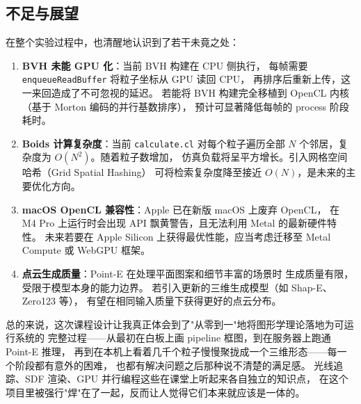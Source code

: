 \subsection{不足与展望}

在整个实验过程中，也清醒地认识到了若干未竟之处：

\begin{enumerate}
  \item \textbf{BVH 未能 GPU 化}：当前 BVH 构建在 CPU 侧执行，
        每帧需要 \texttt{enqueueReadBuffer} 将粒子坐标从 GPU 读回 CPU，
        再排序后重新上传，这一来回造成了不可忽视的延迟。
        若能将 BVH 构建完全移植到 OpenCL 内核（基于 Morton 编码的并行基数排序），
        预计可显著降低每帧的 process 阶段耗时。
  \item \textbf{Boids 计算复杂度}：当前 \texttt{calculate.cl} 对每个粒子遍历全部
        $N$ 个邻居，复杂度为 $O(N^2)$。随着粒子数增加，
        仿真负载将呈平方增长。引入网格空间哈希（Grid Spatial Hashing）
        可将检索复杂度降至接近 $O(N)$，是未来的主要优化方向。
  \item \textbf{macOS OpenCL 兼容性}：Apple 已在新版 macOS 上废弃 OpenCL，
        在 M4 Pro 上运行时会出现 API 飘黄警告，且无法利用 Metal 的最新硬件特性。
        未来若要在 Apple Silicon 上获得最优性能，应当考虑迁移至 Metal Compute 或
        WebGPU 框架。
  \item \textbf{点云生成质量}：Point-E 在处理平面图案和细节丰富的场景时
        生成质量有限，受限于模型本身的能力边界。
        若引入更新的三维生成模型（如 Shap-E、Zero123 等），
        有望在相同输入质量下获得更好的点云分布。
\end{enumerate}

总的来说，这次课程设计让我真正体会到了"从零到一"地将图形学理论落地为可运行系统的
完整过程——从最初在白板上画 pipeline 框图，到在服务器上跑通 Point-E 推理，
再到在本机上看着几千个粒子慢慢聚拢成一个三维形态——每一个阶段都有意外的困难，
也都有解决问题之后那种说不清楚的满足感。
光线追踪、SDF 渲染、GPU 并行编程这些在课堂上听起来各自独立的知识点，
在这个项目里被强行"焊"在了一起，反而让人觉得它们本来就应该是一体的。
